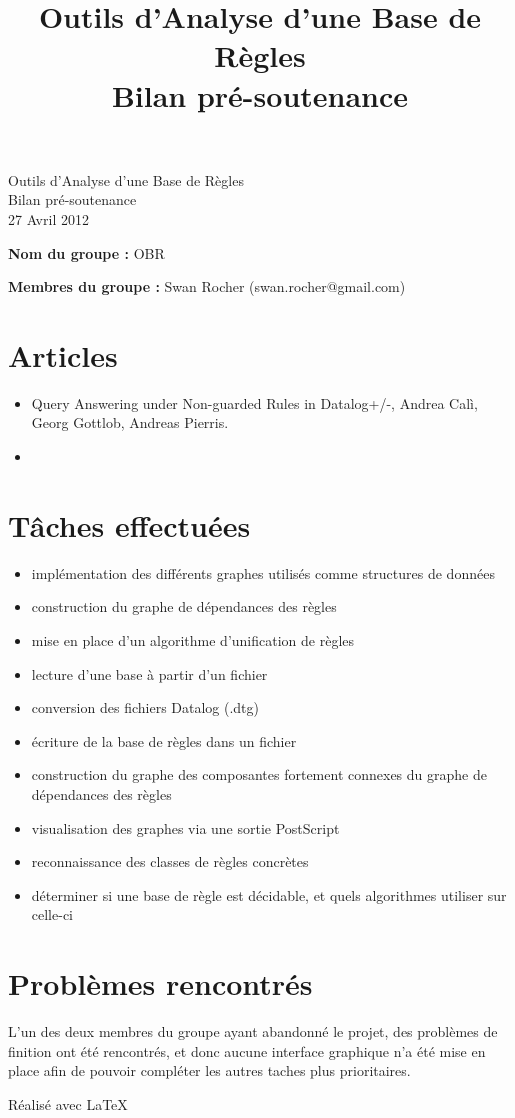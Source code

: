 \documentclass[a4paper]{article}
\title{Outils d'Analyse d'une Base de Règles\\Bilan pré-soutenance}
\begin{document}
\setlength{\parskip}{5mm plus2mm minus2mm}
\begin{center}
	\Huge 
	Outils d'Analyse d'une Base de Règles\\
	\huge
	Bilan pré-soutenance\\
	\Large
	27 Avril 2012
\end{center}

\large

{\bfseries Nom du groupe :} OBR


{\bfseries Membres du groupe :} Swan Rocher (swan.rocher@gmail.com)

\section{Articles}\label{articles}
\begin{itemize}
	\item 
	Query Answering under Non-guarded Rules in Datalog+/-, Andrea Calì, Georg Gottlob,
	Andreas Pierris.
	\item 

\end{itemize}

\section{Tâches effectuées}\label{tasks}
\begin{itemize}
	\item implémentation des différents graphes utilisés comme structures de données 
	\item construction du graphe de dépendances des règles
	\item mise en place d'un algorithme d'unification de règles
	\item lecture d'une base à partir d'un fichier
	\item conversion des fichiers Datalog (.dtg)
	\item écriture de la base de règles dans un fichier
	\item construction du graphe des composantes fortement connexes du graphe de
	dépendances des règles
	\item visualisation des graphes via une sortie PostScript 
	\item reconnaissance des classes de règles concrètes
	\item déterminer si une base de règle est décidable, et quels algorithmes utiliser
	sur celle-ci
\end{itemize}

\section{Problèmes rencontrés}\label{problems}
L'un des deux membres du groupe ayant abandonné le projet, des problèmes de finition
ont été rencontrés,
et donc aucune interface graphique n'a été mise en place afin de
pouvoir compléter les autres taches plus prioritaires.


\vfill
{\raggedleft R\'ealis\'e avec \LaTeX{} \par}
\end{document}
